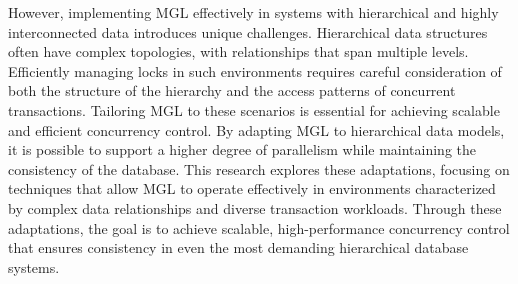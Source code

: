 However, implementing MGL effectively in systems with hierarchical and highly interconnected data introduces unique challenges. Hierarchical data structures often have complex topologies, with relationships that span multiple levels. Efficiently managing locks in such environments requires careful consideration of both the structure of the hierarchy and the access patterns of concurrent transactions. Tailoring MGL to these scenarios is essential for achieving scalable and efficient concurrency control. By adapting MGL to hierarchical data models, it is possible to support a higher degree of parallelism while maintaining the consistency of the database. This research explores these adaptations, focusing on techniques that allow MGL to operate effectively in environments characterized by complex data relationships and diverse transaction workloads. Through these adaptations, the goal is to achieve scalable, high-performance concurrency control that ensures consistency in even the most demanding hierarchical database systems.







